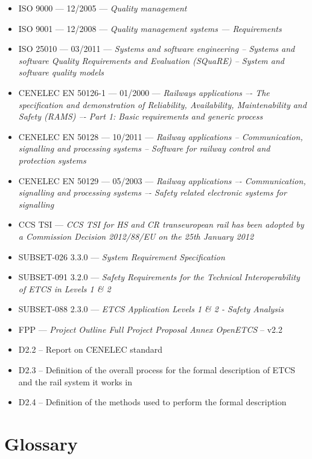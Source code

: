 \documentclass{template/openetcs_report}
\begin{document}
\begin{itemize}
\item ISO 9000 --- 12/2005 --- \emph{Quality management}
\item ISO 9001 --- 12/2008 --- \emph{Quality management systems — Requirements}
\item ISO 25010 --- 03/2011 --- \emph{Systems and software engineering -- Systems and software Quality Requirements and Evaluation (SQuaRE) -- System and software quality models}
\item CENELEC EN 50126-1 --- 01/2000 --- \emph{Railways applications –- The specification and 
demonstration of Reliability, Availability, Maintenability and Safety (RAMS) –- Part 1: 
Basic requirements and generic process}
\item CENELEC EN 50128 --- 10/2011 --- \emph{Railway applications -- Communication, signalling and 
processing systems -- Software for railway control and protection systems}
\item CENELEC EN 50129 --- 05/2003 --- \emph{Railway applications –- Communication, signalling and 
processing systems –- Safety related electronic systems for signalling}
\item CCS TSI --- \emph{ CCS TSI for HS and CR transeuropean rail has been adopted by a Commission Decision 2012/88/EU on the 25th January 2012}
\item SUBSET-026 3.3.0 --- \emph{System Requirement Specification}
\item SUBSET-091 3.2.0 --- \emph{Safety Requirements for the Technical Interoperability
of ETCS in Levels 1 \& 2}
\item SUBSET-088 2.3.0 --- \emph{ETCS Application Levels 1 \& 2 - Safety Analysis}
\item FPP --- \emph{Project Outline Full Project Proposal Annex OpenETCS} -- v2.2
\item D2.2 -- Report on CENELEC standard
\item D2.3 -- Definition of the overall process for the formal description of ETCS and the rail system it works in 
\item D2.4 -- Definition of the methods used to perform the formal description
\end{itemize}



\section{Glossary}
\label{sec:glossary}
\end{document}
